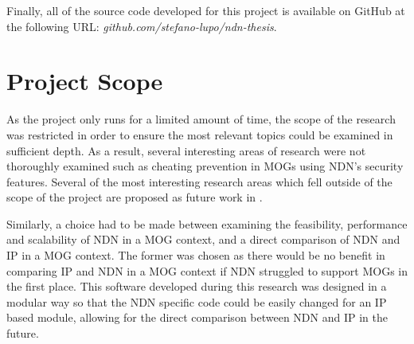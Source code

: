 Finally, all of the source code developed for this project is available on GitHub at the following URL: \textit{github.com/stefano-lupo/ndn-thesis}.


\section{Project Scope}
As the project only runs for a limited amount of time, the scope of the research was restricted in order to ensure the most relevant topics could be examined in sufficient depth. As a result, several interesting areas of research were not thoroughly examined such as cheating prevention in MOGs using NDN's security features. Several of the most interesting research areas which fell outside of the scope of the project are proposed as future work in .

Similarly, a choice had to be made between examining the feasibility, performance and scalability of NDN in a MOG context, and a direct comparison of NDN and IP in a MOG context. The former was chosen as there would be no benefit in comparing IP and NDN in a MOG context if NDN struggled to support MOGs in the first place. This software developed during this research was designed in a modular way so that the NDN specific code could be easily changed for an IP based module, allowing for the direct comparison between NDN and IP in the future.

